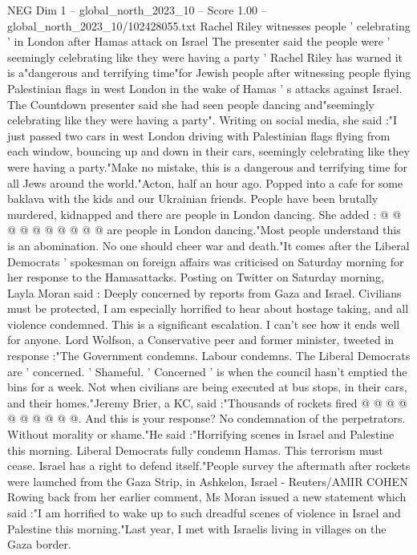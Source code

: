 \begin{textsample}{NEG Dim 1 – global\_north\_2023\_10 – Score 1.00 – global\_north\_2023\_10/102428055.txt}  \label{ex:f1_neg_130}
Rachel Riley witnesses people ' celebrating ' in London after Hamas attack on Israel The presenter said the people were ' seemingly celebrating like they were having a party ' Rachel Riley has warned it is a"dangerous and terrifying time"for Jewish people after witnessing people flying Palestinian flags in west London in the wake of Hamas ' s attacks against Israel.
The Countdown presenter said she had seen people dancing and"seemingly celebrating like they were having a party".
Writing on social media, she said :"I just passed two cars in west London driving with Palestinian flags flying from each window, bouncing up and down in their cars, seemingly celebrating like they were having a party."Make no mistake, this is a dangerous and terrifying time for all Jews around the world."Acton, half an hour ago.
Popped into a cafe for some baklava with the kids and our Ukrainian friends.
People have been brutally murdered, kidnapped and there are people in London dancing.
She added : @ @ @ @ @ @ @ @ @ @ are people in London dancing."Most people understand this is an abomination.
No one should cheer war and death."It comes after the Liberal Democrats ' spokesman on foreign affairs was criticised on Saturday morning for her response to the Hamasattacks.
Posting on Twitter on Saturday morning, Layla Moran said : Deeply concerned by reports from Gaza and Israel.
Civilians must be protected, I am especially horrified to hear about hostage taking, and all violence condemned.
This is a significant escalation.
I can't see how it ends well for anyone.
Lord Wolfson, a Conservative peer and former minister, tweeted in response :"The Government condemns.
Labour condemns.
The Liberal Democrats are ' concerned. ' Shameful. ' Concerned ' is when the council hasn't emptied the bins for a week.
Not when civilians are being executed at bus stops, in their cars, and their homes."Jeremy Brier, a KC, said :"Thousands of rockets fired @ @ @ @ @ @ @ @ @ @.
And this is your response?
No condemnation of the perpetrators.
Without morality or shame."He said :"Horrifying scenes in Israel and Palestine this morning.
Liberal Democrats fully condemn Hamas.
This terrorism must cease.
Israel has a right to defend itself."People survey the aftermath after rockets were launched from the Gaza Strip, in Ashkelon, Israel - Reuters/AMIR COHEN Rowing back from her earlier comment, Ms Moran issued a new statement which said :"I am horrified to wake up to such dreadful scenes of violence in Israel and Palestine this morning."Last year, I met with Israelis living in villages on the Gaza border.

\end{textsample}
